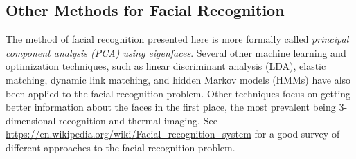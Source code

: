 \subsection*{Other Methods for Facial Recognition} %

The method of facial recognition presented here is more formally called \emph{principal component analysis (PCA) using eigenfaces}.
Several other machine learning and optimization techniques, such as linear discriminant analysis (LDA), elastic matching, dynamic link matching, and hidden Markov models (HMMs) have also been applied to the facial recognition problem.
Other techniques focus on getting better information about the faces in the first place, the most prevalent being 3-dimensional recognition and thermal imaging.
See \url{https://en.wikipedia.org/wiki/Facial_recognition_system} for a good survey of different approaches to the facial recognition problem.

